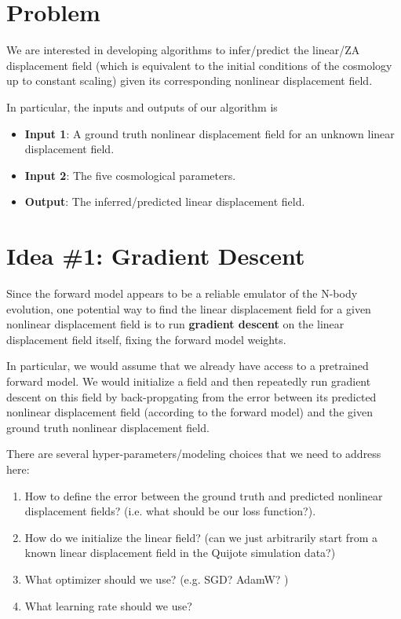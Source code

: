 \documentclass{article}
\begin{document}
\section{Problem}

We are interested in developing algorithms to infer/predict the linear/ZA displacement field (which is equivalent to the initial conditions of the cosmology up to constant scaling) given its corresponding nonlinear displacement field.

In particular, the inputs and outputs of our algorithm is
\begin{itemize}
\setlength\itemsep{-1em}
    \item \textbf{Input 1}: A ground truth nonlinear displacement field for an unknown linear displacement field. \\
    \item \textbf{Input 2}: The five cosmological parameters. \\
    \item \textbf{Output}: The inferred/predicted linear displacement field.
\end{itemize}

\section{Idea \#1: Gradient Descent}

Since the forward model appears to be a reliable emulator of the N-body evolution, one potential way to find the linear displacement field for a given nonlinear displacement field is to run \textbf{gradient descent} on the linear displacement field itself, fixing the forward model weights.

In particular, we would assume that we already have access to a pretrained forward model. We would initialize a field and then repeatedly run gradient descent on this field by back-propgating from the error between its predicted nonlinear displacement field (according to the forward model) and the given ground truth nonlinear displacement field.

There are several hyper-parameters/modeling choices that we need to address here:
\begin{enumerate}
\setlength\itemsep{-1em}
    \item How to define the error between the ground truth and predicted nonlinear displacement fields? (i.e. what should be our loss function?). \\
    \item How do we initialize the linear field? (can we just arbitrarily start from a known linear displacement field in the Quijote simulation data?) \\
    \item What optimizer should we use? (e.g. SGD? AdamW? )\\
    \item What learning rate should we use?
\end{enumerate}
\end{document}
